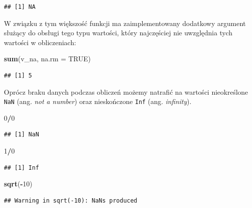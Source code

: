 \documentclass[]{book}
\newenvironment{Shaded}{\begin{snugshade}}{\end{snugshade}}
\newcommand{\KeywordTok}[1]{\textcolor[rgb]{0.13,0.29,0.53}{\textbf{#1}}}
\newcommand{\DataTypeTok}[1]{\textcolor[rgb]{0.13,0.29,0.53}{#1}}
\newcommand{\DecValTok}[1]{\textcolor[rgb]{0.00,0.00,0.81}{#1}}
\newcommand{\OtherTok}[1]{\textcolor[rgb]{0.56,0.35,0.01}{#1}}
\newcommand{\OperatorTok}[1]{\textcolor[rgb]{0.81,0.36,0.00}{\textbf{#1}}}
\newcommand{\NormalTok}[1]{#1}
\begin{document}
\begin{verbatim}
## [1] NA
\end{verbatim}

W związku z tym większość funkcji ma zaimplementowany dodatkowy argument
służący do obsługi tego typu wartości, który najczęściej nie uwzględnia
tych wartości w obliczeniach:

\begin{Shaded}
\begin{Highlighting}[]
\KeywordTok{sum}\NormalTok{(v_na, }\DataTypeTok{na.rm =} \OtherTok{TRUE}\NormalTok{)}
\end{Highlighting}
\end{Shaded}

\begin{verbatim}
## [1] 5
\end{verbatim}

Oprócz braku danych podczas obliczeń możemy natrafić na wartości
nieokreślone \texttt{NaN} (ang. \emph{not a number}) oraz nieskończone
\texttt{Inf} (ang. \emph{infinity}).

\begin{Shaded}
\begin{Highlighting}[]
\DecValTok{0}\OperatorTok{/}\DecValTok{0}
\end{Highlighting}
\end{Shaded}

\begin{verbatim}
## [1] NaN
\end{verbatim}

\begin{Shaded}
\begin{Highlighting}[]
\DecValTok{1}\OperatorTok{/}\DecValTok{0}
\end{Highlighting}
\end{Shaded}

\begin{verbatim}
## [1] Inf
\end{verbatim}

\begin{Shaded}
\begin{Highlighting}[]
\KeywordTok{sqrt}\NormalTok{(}\OperatorTok{-}\DecValTok{10}\NormalTok{)}
\end{Highlighting}
\end{Shaded}

\begin{verbatim}
## Warning in sqrt(-10): NaNs produced
\end{verbatim}
\end{document}
